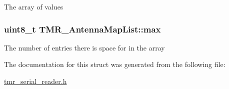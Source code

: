 The array of values \hypertarget{struct_t_m_r___antenna_map_list_a10791133a0a5b4db6e175ce31d1cbef}{
\subsubsection[{max}]{\setlength{\rightskip}{0pt plus 5cm}uint8\_\-t {\bf TMR\_\-AntennaMapList::max}}}
\label{struct_t_m_r___antenna_map_list_a10791133a0a5b4db6e175ce31d1cbef}


The number of entries there is space for in the array 

The documentation for this struct was generated from the following file:\begin{CompactItemize}
\item 
\hyperlink{tmr__serial__reader_8h}{tmr\_\-serial\_\-reader.h}\end{CompactItemize}
